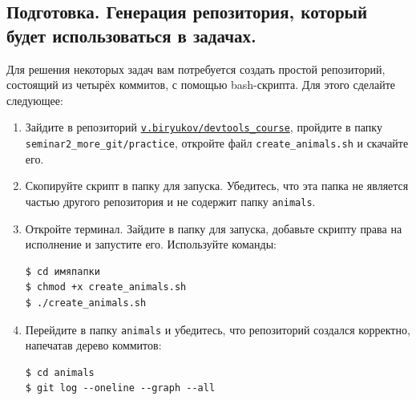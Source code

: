 \documentclass{article}
\begin{document}
\subsection*{Подготовка. Генерация репозитория, который будет использоваться в задачах.}

Для решения некоторых задач вам потребуется создать простой репозиторий, состоящий из четырёх коммитов, с помощью bash-скрипта. Для этого сделайте следующее:

\begin{minipage}{0.65\linewidth}
\begin{enumerate}
\item Зайдите в репозиторий \href{https://mipt-hsse.gitlab.yandexcloud.net/v.biryukov/devtools_course}{\texttt{v.biryukov/devtools\_course}}, пройдите в папку
\texttt{seminar2\_more\_git/practice}, откройте файл \texttt{create\_animals.sh} и скачайте его.

\item Скопируйте скрипт в папку для запуска. Убедитесь, что эта папка не является частью другого репозитория и не содержит папку \texttt{animals}.


\item Откройте терминал. Зайдите в папку для запуска, добавьте скрипту права на исполнение и запустите его. Используйте команды:
\begin{lstlisting}
$ cd имяпапки
$ chmod +x create_animals.sh
$ ./create_animals.sh
\end{lstlisting}

\item Перейдите в папку \texttt{animals} и убедитесь, что репозиторий создался корректно, напечатав дерево коммитов:
\begin{lstlisting}[style=csMiptBash]
$ cd animals
$ git log --oneline --graph --all
\end{lstlisting}
\end{enumerate}
\end{minipage}
\hspace{1cm}
\end{document}
